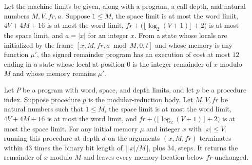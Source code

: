 \begin{theorem}
\label{Light.Emod.sign_ends}
\leanok
{}
Let the machine limits be given, along with a program, a call depth, and natural numbers
$M,V,fr,a$. Suppose $1\le M$, the space limit is at most the word limit, $4V+4M+16$ is
at most the word limit, $fr+\bigl(\lfloor\log_2(V+1)\rfloor+2\bigr)$ is at most the
space limit, and $a=|x|$ for an integer $x$. From a state whose locals are initialized
by the frame $[x,M,fr,a\bmod M,0,t]$ and whose memory is any function $\mu'$, the signed
remainder program has an execution of cost at most $12$ ending in a state whose local at
position $0$ is the integer remainder of $x$ modulo $M$ and whose memory remains $\mu'$.
\end{theorem}

\begin{theorem}
\label{Light.emod_meets}
\leanok
{}
Let $P$ be a program with word, space, and depth limits, and let $p$ be a procedure
index. Suppose procedure $p$ is the modular-reduction body. Let $M,V,fr$ be natural
numbers such that $1\le M$, the space limit is at most the word limit, $4V+4M+16$ is at
most the word limit, and $fr+\bigl(\lfloor\log_2(V+1)\rfloor+2\bigr)$ is at most the
space limit. For any initial memory $\mu$ and integer $x$ with $|x|\le V$, running this
procedure at depth $d$ on the arguments $(x,M,fr)$ terminates within $43$ times the
binary bit length of $\lfloor |x|/M\rfloor$, plus $34$, steps. It returns the remainder
of $x$ modulo $M$ and leaves every memory location below $fr$ unchanged.
\end{theorem}
